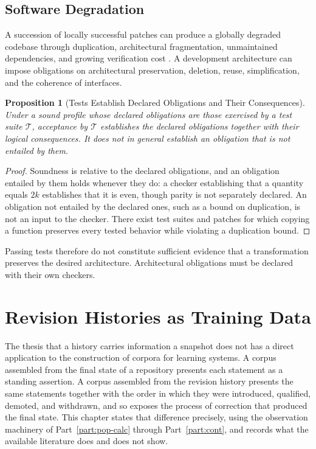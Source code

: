 \documentclass[12pt,oneside,openany]{book}
\theoremstyle{spherepop}
\newtheorem{proposition}[definition]{Proposition}
\theoremstyle{remarkstyle}
\begin{document}
\section{Software Degradation}

A succession of locally successful patches can produce a globally degraded codebase through duplication, architectural fragmentation, unmaintained dependencies, and growing verification cost \cite{sdlt}. A development architecture can impose obligations on architectural preservation, deletion, reuse, simplification, and the coherence of interfaces.

\begin{proposition}[Tests Establish Declared Obligations and Their Consequences]
Under a sound profile whose declared obligations are those exercised by a test suite $\mathcal T$, acceptance by $\mathcal T$ establishes the declared obligations together with their logical consequences. It does not in general establish an obligation that is not entailed by them.
\end{proposition}

\begin{proof}
Soundness is relative to the declared obligations, and an obligation entailed by them holds whenever they do: a checker establishing that a quantity equals $2k$ establishes that it is even, though parity is not separately declared. An obligation not entailed by the declared ones, such as a bound on duplication, is not an input to the checker. There exist test suites and patches for which copying a function preserves every tested behavior while violating a duplication bound.
\end{proof}

Passing tests therefore do not constitute sufficient evidence that a transformation preserves the desired architecture. Architectural obligations must be declared with their own checkers.


\chapter{Revision Histories as Training Data}
\label{ch:revision}

The thesis that a history carries information a snapshot does not has a direct application to the construction of corpora for learning systems. A corpus assembled from the final state of a repository presents each statement as a standing assertion. A corpus assembled from the revision history presents the same statements together with the order in which they were introduced, qualified, demoted, and withdrawn, and so exposes the process of correction that produced the final state. This chapter states that difference precisely, using the observation machinery of Part~\ref{part:pop-calc} through Part~\ref{part:cont}, and records what the available literature does and does not show.
\end{document}
